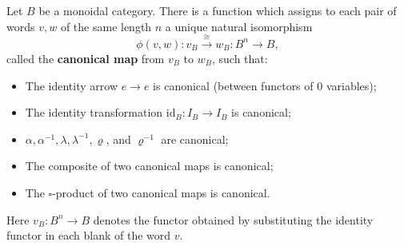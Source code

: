 Let $B$ be a monoidal category. There is a function which assigns to each pair of words $v, w$ of the same length $n$ a unique natural isomorphism
$$\phi(v, w) : v_B \xrightarrow{\cong} w_B : B^n \to B,$$
called the \textbf{canonical map} from $v_B$ to $w_B$, such that:
\begin{itemize}
\item The identity arrow $e \to e$ is canonical (between functors of $0$ variables);
\item The identity transformation $\mathrm{id}_B : I_B \to I_B$ is canonical;
\item $\alpha, \alpha^{-1}, \lambda, \lambda^{-1}, \varrho$, and $\varrho^{-1}$ are canonical;
\item The composite of two canonical maps is canonical;
\item The $\square$-product of two canonical maps is canonical.
\end{itemize}
Here $v_B : B^n \to B$ denotes the functor obtained by substituting the identity functor in each blank of the word $v$.
